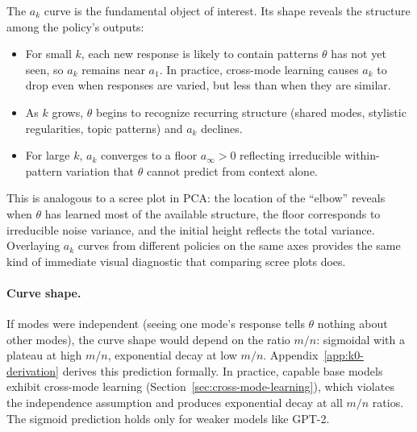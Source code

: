 The $a_k$ curve is the fundamental object of interest.
Its shape reveals the structure among the policy's outputs:
\begin{itemize}[nosep]
    \item For small $k$, each new response is likely to contain patterns $\theta$ has not yet seen, so $a_k$ remains near $a_1$.
In practice, cross-mode learning causes $a_k$ to drop even when responses are varied, but less than when they are similar.
    \item As $k$ grows, $\theta$ begins to recognize recurring structure (shared modes, stylistic regularities, topic patterns) and $a_k$ declines.
    \item For large $k$, $a_k$ converges to a floor $a_\infty > 0$ reflecting irreducible within-pattern variation that $\theta$ cannot predict from context alone.
\end{itemize}

This is analogous to a scree plot in PCA: the location of the ``elbow'' reveals when $\theta$ has learned most of the available structure, the floor corresponds to irreducible noise variance, and the initial height reflects the total variance.
Overlaying $a_k$ curves from different policies on the same axes provides the same kind of immediate visual diagnostic that comparing scree plots does.

\paragraph{Curve shape.} If modes were independent (seeing one mode's response tells $\theta$ nothing about other modes), the curve shape would depend on the ratio $m/n$: sigmoidal with a plateau at high $m/n$, exponential decay at low $m/n$.
Appendix~\ref{app:k0-derivation} derives this prediction formally.
In practice, capable base models exhibit cross-mode learning (Section~\ref{sec:cross-mode-learning}), which violates the independence assumption and produces exponential decay at all $m/n$ ratios.
The sigmoid prediction holds only for weaker models like GPT-2.

